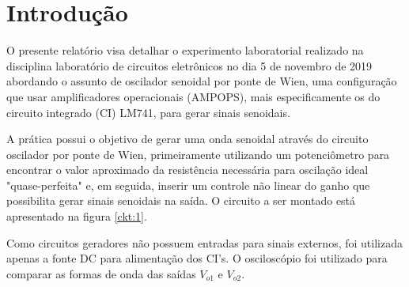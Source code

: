 \section{Introdução}

O presente relatório visa detalhar o experimento laboratorial realizado na disciplina laboratório de circuitos eletrônicos no dia 5 de novembro de 2019 abordando o assunto de oscilador senoidal por ponte de Wien, uma configuração que usar   amplificadores operacionais (AMPOPS), mais especificamente os do circuito integrado (CI) LM741, para gerar sinais senoidais.  

A prática possui o objetivo de gerar uma onda senoidal através do circuito oscilador por ponte de Wien, primeiramente utilizando um potenciômetro para encontrar o valor aproximado da resistência necessária para oscilação ideal "quase-perfeita" e, em seguida, inserir um controle não linear do ganho que possibilita gerar sinais senoidais na saída. O circuito a ser montado está apresentado na figura \ref{ckt:1}.



Como circuitos geradores não possuem entradas para sinais externos, foi utilizada apenas a fonte DC para alimentação dos CI's. O osciloscópio foi utilizado para comparar as formas de onda das saídas $V_{o1}$ e $V_{o2}$.